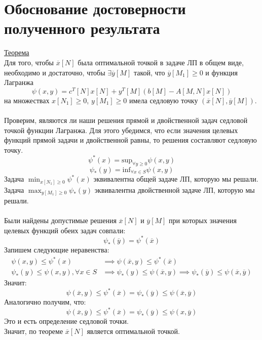 \section{Обоснование достоверности полученного результата}
\underline{Теорема}\\
Для того, чтобы $\overline{x}[N]$ была оптимальной точкой в задаче ЛП в общем виде, необходимо и достаточно, чтобы $\exists \overline{y}[M]$ такой, что $ \overline{y}[M_1]\geq0$ и функция Лагранжа
\begin{equation*}
\psi(x,y)=c^T[N]x[N]+y^T[M](b[M]-A[M,N]x[N])
\end{equation*}
на множествах $x[N_1]\geq0$, $y[M_1]\geq0$ имела седловую точку $(\overline{x}[N],\overline{y}[M])$.\\
\\
Проверим, являются ли наши решения прямой и двойственной задач седловой точкой функции Лагранжа. Для этого убедимся, что если значения целевых функций прямой задачи и двойственной равны, то решения составляют седловую точку.\\
\begin{equation*}
\psi^{\ast}(x)=\text{sup}_{\forall y\geq0}\psi(x,y)
\end{equation*}
\begin{equation*}
\psi_{\ast}(y)=\text{inf}_{\forall x \in S}\psi(x,y)
\end{equation*}
Задача $\min_{x[N_1]\geq0} \psi^{\ast}(x)$ эквивалентна общей задаче ЛП, которую мы решали. \\
Задача $\max_{y[M_1]\geq0} \psi_{\ast}(y)$ эквивалентна двойственной задаче ЛП, которую мы решали.\\
\\
Были найдены допустимые решения $\overline{x}[N]$ и $\overline{y}[M]$ при которых значения целевых функций обеих задач совпали:
\begin{equation*}
\psi_{\ast}(\overline{y})=\psi^{\ast}(\overline{x})
\end{equation*}
Запишем следующие неравенства:
\begin{align*}
\psi(x,y)\leq \psi^{\ast}(x) &\implies \psi(\overline{x},y)\leq \psi^{\ast}(\overline{x}) \\
\psi_{\ast}(y)\leq \psi(x,y),\forall x \in S &\implies \psi_{\ast}(y)\leq \psi(\overline{x},y) \implies \psi_{\ast}(\overline{y})\leq \psi(\overline{x},\overline{y})
\end{align*} 
Значит:
\begin{equation*}
\psi(\overline{x},y)\leq \psi^{\ast}(\overline{x})=\psi_{\ast}(\overline{y})\leq \psi(\overline{x},\overline{y})
\end{equation*}
Аналогично получим, что:
\begin{equation*}
\psi(\overline{x},\overline{y})\leq \psi^{\ast}(\overline{x})=\psi_{\ast}(\overline{y})\leq \psi(x,\overline{y})
\end{equation*}
Это и есть определение седловой точки.\\
Значит, по теореме $\overline{x}[N]$ является оптимальной точкой.



